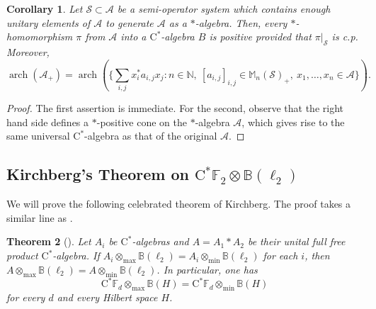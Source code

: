\documentclass[12pt]{amsart}
\newtheorem{thm}{Theorem}
\newtheorem{cor}[thm]{Corollary}
\theoremstyle{definition}
\begin{document}
\begin{cor}\label{cor:pisier}
Let ${{\mathcal S}}\subset{{\mathcal A}}$ be a semi-operator system which contains
enough unitary elements of ${{\mathcal A}}$ to generate ${{\mathcal A}}$ as a $*$-algebra.
Then, every {$*$-homo\-mor\-phism\xspace} $\pi$ from ${{\mathcal A}}$ into a
{$\mathrm{C}^*$-alge\-bra\xspace} $B$ is positive provided that $\pi|_{{\mathcal S}}$ is c.p.
Moreover,
\[
\operatorname*{arch}({{\mathcal A}}_+) = \operatorname*{arch}( \{\sum_{i,j} x_i^*a_{i,j}x_j : n\in{{\mathbb N}},\ [a_{i,j}]_{i,j}\in{{\mathbb M}}_n({{\mathcal S}})_+,\ x_1,\ldots,x_n\in{{\mathcal A}}\}).
\]
\end{cor}
\begin{proof}
The first assertion is immediate.
For the second, observe that the right hand side defines a
$*$-positive cone on the $*$-algebra ${{\mathcal A}}$, which gives rise to the
same universal {$\mathrm{C}^*$-alge\-bra\xspace} as that of the original ${{\mathcal A}}$.
\end{proof}
\subsection{Kirchberg's Theorem on $\mathrm{C}^*{{\mathbb F}}_2\otimes{{\mathbb B}}(\ell_2)$}
We will prove the following celebrated theorem of Kirchberg.
The proof takes a similar line as \cite{pisier,fp}.
\begin{thm}[\cite{kirchberg}]\label{thm:kirchberg}
Let $A_i$ be {$\mathrm{C}^*$-alge\-bra\xspace}{}s and $A=A_1*A_2$ be their unital full free product {$\mathrm{C}^*$-alge\-bra\xspace}.
If $A_i\otimes_{\max}{{\mathbb B}}(\ell_2)=A_i\otimes_{\min}{{\mathbb B}}(\ell_2)$ for each $i$, then
$A\otimes_{\max}{{\mathbb B}}(\ell_2)=A\otimes_{\min}{{\mathbb B}}(\ell_2)$.
In particular, one has
\[
\mathrm{C}^*{{\mathbb F}}_d\otimes_{\max}{{\mathbb B}}({H})=\mathrm{C}^*{{\mathbb F}}_d\otimes_{\min}{{\mathbb B}}({H})
\]
for every $d$ and every Hilbert space ${H}$.
\end{thm}
\end{document}
